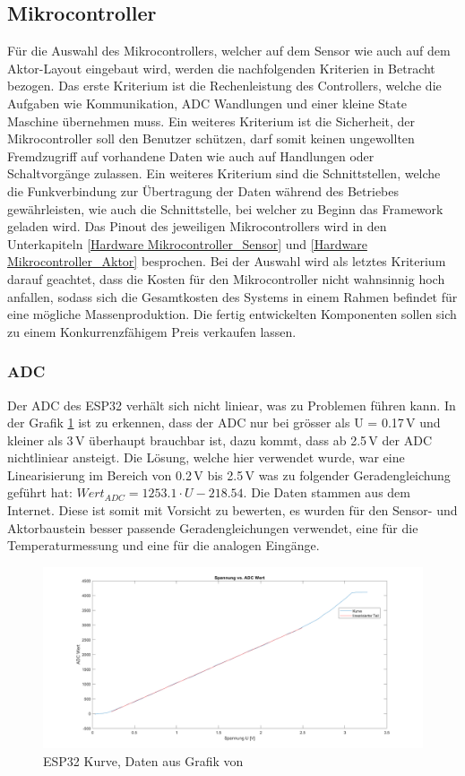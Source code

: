 \subsection{Mikrocontroller}\label{subsec: Mikrocontroller}
Für die Auswahl des Mikrocontrollers, welcher auf dem Sensor wie auch auf dem Aktor-Layout eingebaut wird, werden die nachfolgenden Kriterien in Betracht bezogen. Das erste Kriterium ist die Rechenleistung des Controllers, welche die Aufgaben wie Kommunikation, ADC Wandlungen und einer kleine State Maschine übernehmen muss.
Ein weiteres Kriterium ist die Sicherheit, der Mikrocontroller soll den Benutzer schützen, darf somit keinen ungewollten Fremdzugriff auf vorhandene Daten wie auch auf Handlungen oder Schaltvorgänge zulassen. Ein weiteres Kriterium sind die Schnittstellen, welche die Funkverbindung zur Übertragung der Daten während des Betriebes gewährleisten, wie auch die Schnittstelle, bei welcher zu Beginn das Framework geladen wird. Das Pinout des jeweiligen Mikrocontrollers wird in den Unterkapiteln \ref{Hardware Mikrocontroller_Sensor} und \ref{Hardware Mikrocontroller_Aktor} besprochen. Bei der Auswahl wird als letztes Kriterium darauf geachtet, dass die Kosten für den Mikrocontroller nicht wahnsinnig hoch anfallen, sodass sich die Gesamtkosten des Systems in einem Rahmen befindet für eine mögliche Massenproduktion. Die fertig entwickelten Komponenten sollen sich zu einem Konkurrenzfähigem Preis verkaufen lassen.
\subsubsection{ADC}
Der ADC des ESP32 verhält sich nicht liniear, was zu Problemen führen kann. In der Grafik \ref{pic: ESP32_Kurve} ist zu erkennen, dass der ADC nur bei grösser als U = 0.17\,V und kleiner als 3\,V überhaupt brauchbar ist, dazu kommt, dass ab 2.5\,V der ADC nichtliniear ansteigt. Die Lösung, welche hier verwendet wurde, war eine Linearisierung im Bereich von  0.2\,V bis 2.5\,V was zu folgender Geradengleichung geführt hat: $Wert_{ADC} = 1253.1\cdot U - 218.54$. Die Daten stammen aus dem Internet. Diese ist somit mit Vorsicht zu bewerten, es wurden für den Sensor- und Aktorbaustein besser passende Geradengleichungen verwendet, eine für die Temperaturmessung und eine für die analogen Eingänge.
\begin{figure}[h!]
	\centering
	\includegraphics[width=\textwidth]{graphics/ESP32_Kurve.png}
	\caption{ESP32 Kurve, Daten aus Grafik von \cite{randomnerdtutorials_esp32_2019}}
	\label{pic: ESP32_Kurve}
\end{figure}

